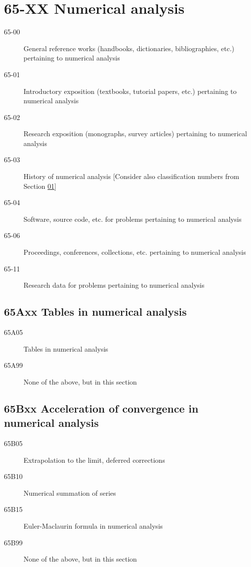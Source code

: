 \documentclass[letterpaper]{article}
\begin{document}
\section*{65-XX Numerical analysis }\label{65-XX}
\begin{description}
\item [65-00]\label{65-00} General reference works (handbooks, dictionaries, bibliographies, etc.) pertaining to numerical analysis
\item [65-01]\label{65-01} Introductory exposition (textbooks, tutorial papers, etc.) pertaining to numerical analysis
\item [65-02]\label{65-02} Research exposition (monographs, survey articles) pertaining to numerical analysis
\item [65-03]\label{65-03} History of numerical analysis [Consider also classification numbers from Section \hyperref[01-XX]{01}]
\item [65-04]\label{65-04} Software, source code, etc. for problems pertaining to numerical analysis
\item [65-06]\label{65-06} Proceedings, conferences, collections, etc. pertaining to numerical analysis
\item [65-11]\label{65-11} Research data for problems pertaining to numerical analysis
\end{description}
\subsection*{65Axx  Tables in numerical analysis}\label{65Axx}
\begin{description}  
\item [65A05]\label{65A05} Tables in numerical analysis
\item [65A99]\label{65A99} None of the above, but in this section
\end{description}
\subsection*{65Bxx  Acceleration of convergence in numerical analysis }\label{65Bxx}
\begin{description}  
\item [65B05]\label{65B05} Extrapolation to the limit, deferred corrections
\item [65B10]\label{65B10} Numerical summation of series
\item [65B15]\label{65B15} Euler-Maclaurin formula in numerical analysis
\item [65B99]\label{65B99} None of the above, but in this section
\end{description}
\end{document}
